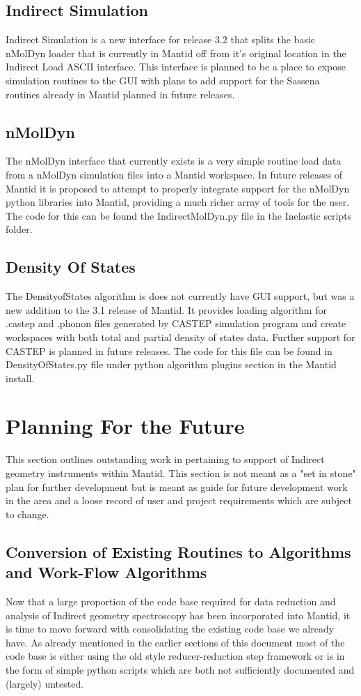 \documentclass[paper=a4, fontsize=11pt]{scrartcl}	%
\numberwithin{equation}{section}															%
\numberwithin{figure}{section}																%
\numberwithin{table}{section}																%
\begin{document}
\subsection{Indirect Simulation}
Indirect Simulation is a new interface for release 3.2 that splits the basic nMolDyn loader that is currently in Mantid off from it's original location in the Indirect Load ASCII interface. This interface is planned to be a place to expose simulation routines to the GUI with plans to add support for the Sassena routines already in Mantid planned in future releases.

\subsection{nMolDyn}
The nMolDyn interface that currently exists is a very simple routine load data from a nMolDyn simulation files into a Mantid workspace. In future releases of Mantid it is proposed to attempt to properly integrate support for the nMolDyn python libraries into Mantid, providing a much richer array of tools for the user. The code for this can be found the IndirectMolDyn.py file in the Inelastic scripts folder.

\subsection{Density Of States}
The DensityofStates algorithm is does not currently have GUI support, but was a new addition to the 3.1 release of Mantid. It provides loading algorithm for .castep and .phonon files generated by CASTEP simulation program and create workspaces with both total and partial density of states data. Further support for CASTEP is planned in future releases. The code for this file can be found in DensityOfStates.py file under python algorithm plugins section in the Mantid install.

\section{Planning For the Future}
This section outlines outstanding work in pertaining to support of Indirect geometry instruments within Mantid. This section is not meant as a "set in stone" plan for further development but is meant as guide for future development work in the area and a loose record of user and project requirements which are subject to change.

\subsection{Conversion of Existing Routines to Algorithms and Work-Flow Algorithms}
Now that a large proportion of the code base required for data reduction and analysis of Indirect geometry spectroscopy has been incorporated into Mantid, it is time to move forward with consolidating the existing code base we already have. As already mentioned in the earlier sections of this document most of the code base is either using the old style reducer-reduction step framework or is in the form of simple python scripts which are both not sufficiently documented and (largely) untested.
\end{document}
